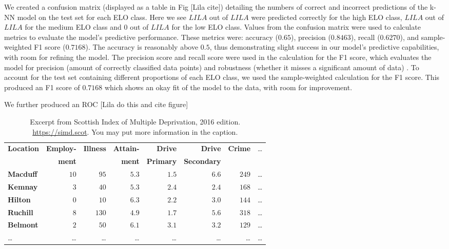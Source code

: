 \documentclass[10pt,a4paper,twocolumn]{article}
\begin{document}
We created a confusion matrix (displayed as a table in Fig [Lila cite]) detailing the numbers of correct and incorrect predictions of the k-NN model on the test set for each ELO class. Here we see $ LILA $ out of $LILA$ were predicted correctly for the high ELO class, $LILA$ out of $LILA$ for the medium ELO class and $0$ out of $LILA$ for the low ELO class. Values from the confusion matrix were used to calculate metrics to evaluate the model's predictive performance. These metrics were: accuracy ($0.65$), precision ($0.8463$), recall ($0.6270$), and sample-weighted F1 score ($0.7168$). The accuracy is reasonably above $0.5$, thus demonstrating slight success in our model's predictive capabilities, with room for refining the model. The precision score and recall score were used in the calculation for the F1 score, which evaluates the model for precision (amount of correctly classified data points) and robustness (whether it misses a significant amount of data) \cite{MetricsToEvaluateYourML}. To account for the test set containing different proportions of each ELO class, we used the sample-weighted calculation for the F1 score. This produced an F1 score of $0.7168$ which shows an okay fit of the model to the data, with room for improvement. \newline

We further produced an ROC [Lila do this and cite figure]

\begin{table}[b]
  \centering
  \caption{Excerpt from Scottish Index of Multiple Deprivation, 2016 edition.
    \url{https://simd.scot}. You may put more information in the caption.}
  \label{tab:example1}
\begin{tabular}{lrrrrrrr}
\hline\hline
\textbf{Location}&\textbf{Employ-}&\textbf{Illness}&\textbf{Attain-}&\textbf{Drive}  &\textbf{Drive}    &\textbf{Crime}&\dots\\
                 &\textbf{ment}   &                &\textbf{ment}   &\textbf{Primary}&\textbf{Secondary}&              &\\
\hline
\textbf{Macduff}&$10$&$ 95$&$5.3$&$1.5$&$6.6$&$249$&\dots\tabularnewline
\textbf{Kemnay}&$ 3$&$ 40$&$5.3$&$2.4$&$2.4$&$168$&\dots\tabularnewline
\textbf{Hilton}&$ 0$&$ 10$&$6.3$&$2.2$&$3.0$&$144$&\dots\tabularnewline
\textbf{Ruchill}&$ 8$&$130$&$4.9$&$1.7$&$5.6$&$318$&\dots\tabularnewline
\textbf{Belmont}&$ 2$&$ 50$&$6.1$&$3.1$&$3.2$&$129$&\dots\tabularnewline
\dots&\dots&\dots&\dots&\dots&\dots&\dots&\dots\tabularnewline
\hline
\end{tabular}
\end{table}
\end{document}
